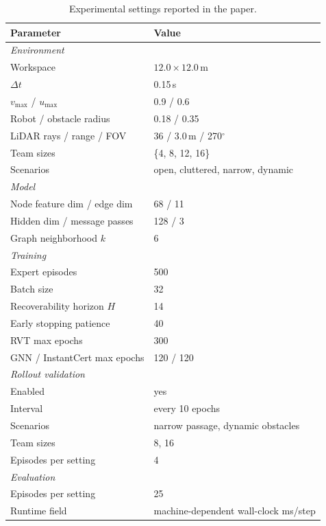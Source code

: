 \documentclass{ieeeaccess}
\begin{document}
\begin{table}[H]
\centering
\caption{Experimental settings reported in the paper.}
\label{tab:hyperparams}
\scriptsize
\begin{tabular}{ll}
\toprule
\textbf{Parameter} & \textbf{Value} \\
\midrule
\multicolumn{2}{l}{\emph{Environment}} \\
Workspace & $12.0 \times 12.0$\,m \\
$\Delta t$ & 0.15\,s \\
$v_{\max}$ / $u_{\max}$ & 0.9 / 0.6 \\
Robot / obstacle radius & 0.18 / 0.35 \\
LiDAR rays / range / FOV & 36 / 3.0\,m / 270$^\circ$ \\
Team sizes & \{4, 8, 12, 16\} \\
Scenarios & open, cluttered, narrow, dynamic \\
\midrule
\multicolumn{2}{l}{\emph{Model}} \\
Node feature dim / edge dim & 68 / 11 \\
Hidden dim / message passes & 128 / 3 \\
Graph neighborhood $k$ & 6 \\
\midrule
\multicolumn{2}{l}{\emph{Training}} \\
Expert episodes & 500 \\
Batch size & 32 \\
Recoverability horizon $H$ & 14 \\
Early stopping patience & 40 \\
RVT max epochs & 300 \\
GNN / InstantCert max epochs & 120 / 120 \\
\midrule
\multicolumn{2}{l}{\emph{Rollout validation}} \\
Enabled & yes \\
Interval & every 10 epochs \\
Scenarios & narrow passage, dynamic obstacles \\
Team sizes & 8, 16 \\
Episodes per setting & 4 \\
\midrule
\multicolumn{2}{l}{\emph{Evaluation}} \\
Episodes per setting & 25 \\
Runtime field & machine-dependent wall-clock ms/step \\
\bottomrule
\end{tabular}
\end{table}
\end{document}

